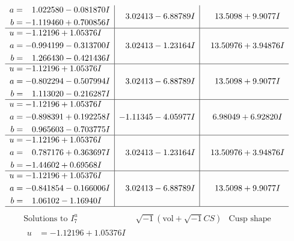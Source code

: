 \documentclass[1p]{elsarticle_modified}
\theoremstyle{definition}
\newcommand{\I}{\sqrt{-1}}
\begin{document}
$$\begin{array}{c|c|c}
\begin{aligned}
a &= \phantom{-}1.022580 - 0.081870 I \\
b &= -1.119460 + 0.700856 I\end{aligned}
 & \phantom{-}3.02413 - 6.88789 I & \phantom{-}13.5098 + 9.9077 I \\ \hline\begin{aligned}
u &= -1.12196 + 1.05376 I \\
a &= -0.994199 - 0.313700 I \\
b &= \phantom{-}1.266430 - 0.421436 I\end{aligned}
 & \phantom{-}3.02413 - 1.23164 I & \phantom{-}13.50976 + 3.94876 I \\ \hline\begin{aligned}
u &= -1.12196 + 1.05376 I \\
a &= -0.802294 - 0.507994 I \\
b &= \phantom{-}1.113020 - 0.216287 I\end{aligned}
 & \phantom{-}3.02413 - 6.88789 I & \phantom{-}13.5098 + 9.9077 I \\ \hline\begin{aligned}
u &= -1.12196 + 1.05376 I \\
a &= -0.898391 + 0.192258 I \\
b &= \phantom{-}0.965603 - 0.703775 I\end{aligned}
 & -1.11345 - 4.05977 I & \phantom{-}6.98049 + 6.92820 I \\ \hline\begin{aligned}
u &= -1.12196 + 1.05376 I \\
a &= \phantom{-}0.787176 + 0.363697 I \\
b &= -1.44602 + 0.69568 I\end{aligned}
 & \phantom{-}3.02413 - 1.23164 I & \phantom{-}13.50976 + 3.94876 I \\ \hline\begin{aligned}
u &= -1.12196 + 1.05376 I \\
a &= -0.841854 - 0.166006 I \\
b &= \phantom{-}1.06102 - 1.16940 I\end{aligned}
 & \phantom{-}3.02413 - 6.88789 I & \phantom{-}13.5098 + 9.9077 I\\
 \hline 
 \end{array}$$\newpage$$\begin{array}{c|c|c}  
\text{Solutions to }I^u_{7}& \I (\text{vol} + \sqrt{-1}CS) & \text{Cusp shape}\\
 \hline 
\begin{aligned}
u &= -1.12196 + 1.05376 I \\

\end{aligned}
\end{array}$$
\end{document}
